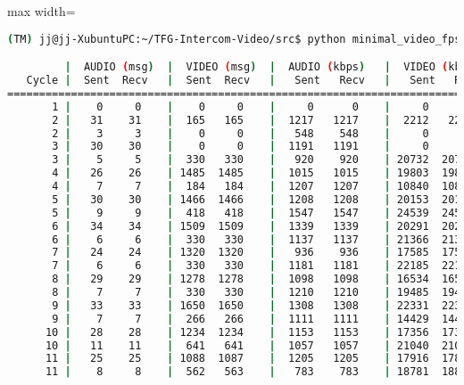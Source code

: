 \begin{adjustbox}{max width=\textwidth}
\begin{lstlisting}[language=bash,basicstyle=\ttfamily\scriptsize]
(TM) jj@jj-XubuntuPC:~/TFG-Intercom-Video/src$ python minimal_video_fps.py --show_video --show_stats --camera_index 1 -z 12

         |  AUDIO (msg)  |  VIDEO (msg)  |  AUDIO (kbps)   |  VIDEO (kbps)   |     CPU (%) 
   Cycle |  Sent  Recv   |  Sent  Recv   |   Sent   Recv   |   Sent   Recv   | Program System
================================================================================================
       1 |    0     0    |    0     0    |     0      0    |     0      0    |   0    100       
       2 |   31    31    |  165   165    |  1217   1217    |  2212   2212    |  38     68       
       2 |    3     3    |    0     0    |   548    548    |     0      0    |  33     67       
       3 |   30    30    |    0     0    |  1191   1191    |     0      0    |  47     72       
       3 |    5     5    |  330   330    |   920    920    | 20732  20732    |  22     71       
       4 |   26    26    | 1485  1485    |  1015   1015    | 19803  19803    |  28     67       
       4 |    7     7    |  184   184    |  1207   1207    | 10840  10840    |  42     67       
       5 |   30    30    | 1466  1466    |  1208   1208    | 20153  20153    |  46     64       
       5 |    9     9    |  418   418    |  1547   1547    | 24539  24539    |  52     66       
       6 |   34    34    | 1509  1509    |  1339   1339    | 20291  20291    |  39     71       
       6 |    6     6    |  330   330    |  1137   1137    | 21366  21366    |  28     69       
       7 |   24    24    | 1320  1320    |   936    936    | 17585  17585    |  44     67       
       7 |    6     6    |  330   330    |  1181   1181    | 22185  22185    |  42     68       
       8 |   29    29    | 1278  1278    |  1098   1098    | 16534  16534    |  45     66       
       8 |    7     7    |  330   330    |  1210   1210    | 19485  19485    |  42     66       
       9 |   33    33    | 1650  1650    |  1308   1308    | 22331  22331    |  36     72       
       9 |    7     7    |  266   266    |  1111   1111    | 14429  14429    |  19     72       
      10 |   28    28    | 1234  1234    |  1153   1153    | 17356  17356    |  44     72       
      10 |   11    11    |  641   641    |  1057   1057    | 21040  21040    |  41     73       
      11 |   25    25    | 1088  1087    |  1205   1205    | 17916  17899    |  26     74       
      11 |    8     8    |  562   563    |   783    783    | 18781  18815    |  35     73       

\end{lstlisting}
\end{adjustbox}
